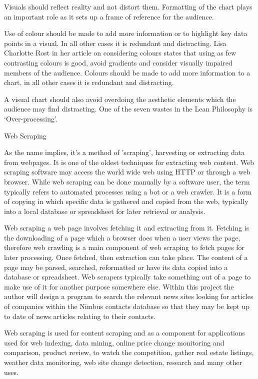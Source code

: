 	Visuals should reflect reality and not distort them. Formatting of the chart plays an important role as it sets up a frame of reference for the audience.

	Use of colour should be made to add more information or to highlight key data points in a visual. In all other cases it is redundant and distracting. Lisa Charlotte Rost in her article on considering colours states that using as few contrasting colours is good, avoid gradients and consider visually impaired members of the audience. Colours should be made to add more information to a chart, in all other cases it is redundant and distracting. \cite{Rost2018}

A visual chart should also avoid overdoing the aesthetic elements which the audience may find distracting. One of the seven wastes in the Lean Philosophy is ‘Over-processing’. \cite{Dombrowski2014}


Web Scraping

As the name implies, it's a method of 'scraping', harvesting or extracting data from webpages. It is one of the oldest techniques for extracting web content. \cite{Glez-Pena2013a} Web scraping software may access the world wide web using HTTP or through a web browser. While web scraping can be done manually by a software user, the term typically refers to automated processes using a bot or a web crawler. It is a form of copying in which specific data is gathered and copied from the web, typically into a local database or spreadsheet for later retrieval or analysis.

Web scraping a web page involves fetching it and extracting from it. Fetching is the downloading of a page which a browser does when a user views the page, therefore web crawling is a main component of web scraping to fetch pages for later processing. Once fetched, then extraction can take place.
The content of a page may be parsed, searched, reformatted or have its data copied into a database or spreadsheet. Web scrapers typically take something out of a page to make use of it for another purpose somewhere else. Within this project the author will design a program to search the relevant news sites looking for articles of companies within the Nimbus contacts database so that they may be kept up to date of news articles relating to their contacts. 

Web scraping is used for content scraping and as a component for applications used for web indexing, data mining, online price change monitoring and comparison, product review, to watch the competition, gather real estate listings, weather data monitoring, web site change detection, research and many other uses.

